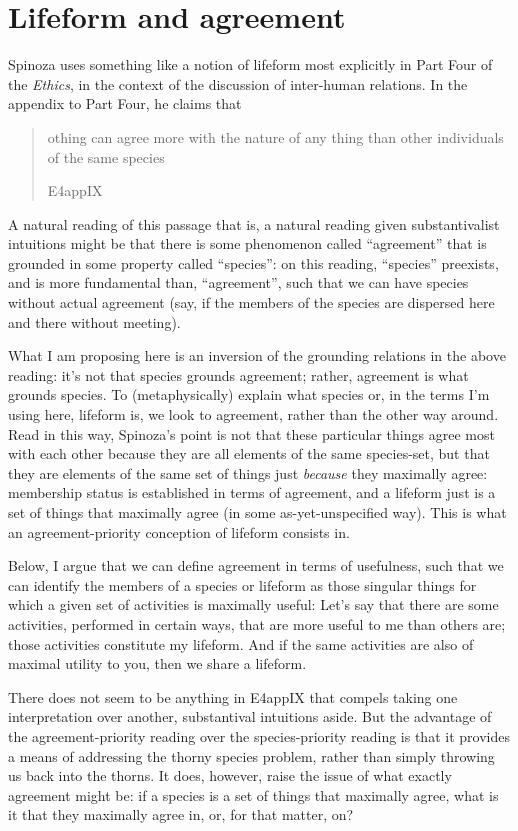 \documentclass{article}
\newcommand{\dash}{\unskip{—}}
\newcommand\foreign[2]{\foreignlanguage{#1}{\emph{#2}}}
\newcommand\texttitle[1]{\emph{#1}}
\begin{document}
\section{Lifeform and agreement}\label{sec:Agreement}
Spinoza uses something like a notion of lifeform most explicitly in Part Four of the \texttitle{Ethics}, in the context of the discussion of inter-human relations. In the appendix to Part Four, he claims that \blockquote[E4app\RN{9}]{othing can agree \textins{\foreign{latin}{convenire}} more with the nature of any thing than other individuals of the same species}. A natural reading of this passage \dash that is, a natural reading given substantivalist intuitions \dash might be that there is some phenomenon called \enquote{agreement} that is grounded in some property called \enquote{species}: on this reading, \enquote{species} preexists, and is more fundamental than, \enquote{agreement}, such that we can have species without actual agreement (say, if the members of the species are dispersed here and there without meeting).

What I am proposing here is an inversion of the grounding relations in the above reading: it's not that species grounds agreement; rather, agreement is what grounds species. To (metaphysically) explain what species \dash or, in the terms I'm using here, lifeform \dash is, we look to agreement, rather than the other way around. Read in this way, Spinoza's point is not that these particular things agree most with each other because they are all elements of the same species-set, but that they are elements of the same set of things just \emph{because} they maximally agree: membership status is established in terms of agreement, and a lifeform just is a set of things that maximally agree (in some as-yet-unspecified way). This is what an agreement-priority conception of lifeform consists in.

Below, I argue that we can define agreement in terms of usefulness, such that we can identify the members of a species or  lifeform as those singular things for which a given set of activities is maximally useful: Let's say that there are some activities, performed in certain ways, that are more useful to me than others are; those activities constitute my lifeform. And if the same activities are also of maximal utility to you, then we share a lifeform.

There does not seem to be anything in E4app\RN{9} that compels taking one interpretation over another, substantival intuitions aside. But the advantage of the agreement-priority reading over the species-priority reading is that it provides a means of addressing the thorny species problem, rather than simply throwing us back into the thorns. It does, however, raise the issue of what exactly agreement might be: if a species is a set of things that maximally agree, what is it that they maximally agree in, or, for that matter, on?
\end{document}
